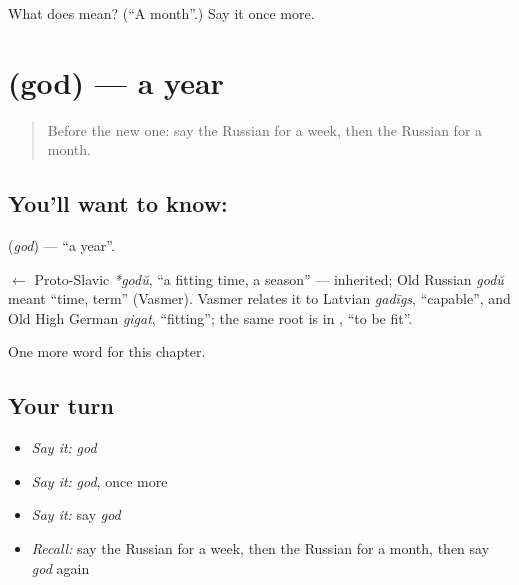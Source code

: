 \begin{tcolorbox}[breakable,colback=teal!4,colframe=teal!35!black,title={Before you move on}]
What does  mean? (\textquotedblleft{}A month\textquotedblright{}.) Say it once more.
\end{tcolorbox}
\section[\texorpdfstring{\ru{год} (god)}{год (god)}]{ (god) — a year}

\label{lesson:RU-C68-year}



\begin{quote}
Before the new one: say the Russian for a week, then the Russian for a month.
\end{quote}

\subsection*{You'll want to know: }
\textbf{} (\emph{god}) — \textquotedblleft{}a year\textquotedblright{}.

\begin{cousinweb}
\textbf{} $\leftarrow$ Proto-Slavic \emph{*godŭ}, \textquotedblleft{}a fitting time, a season\textquotedblright{} — inherited; Old Russian \emph{godŭ} meant \textquotedblleft{}time, term\textquotedblright{} (Vasmer). Vasmer relates it to Latvian \emph{gadīgs}, \textquotedblleft{}capable\textquotedblright{}, and Old High German \emph{gigat}, \textquotedblleft{}fitting\textquotedblright{}; the same root is in \emph{}, \textquotedblleft{}to be fit\textquotedblright{}.
\end{cousinweb}

\begin{grammarlens}[title={What you've built}]
One more word for this chapter.
\end{grammarlens}

\subsection*{Your turn}
\begin{itemize}
\raggedright
  \item \emph{Say it:} \emph{god}
  \item \emph{Say it:} \emph{god}, once more
  \item \emph{Say it:} say \emph{god}
  \item \emph{Recall:} say the Russian for a week, then the Russian for a month, then say \emph{god} again
\end{itemize}

